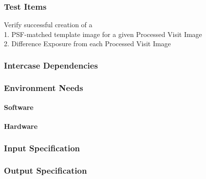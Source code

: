 \subsubsection{Test Items}
Verify successful creation of a\\
1. PSF-matched template image for a given Processed Visit Image\\
2. Difference Exposure from each Processed Visit Image



\subsubsection{Intercase Dependencies}

\subsubsection{Environment Needs}

\paragraph{Software}

\paragraph{Hardware}

\subsubsection{Input Specification}

\subsubsection{Output Specification}

